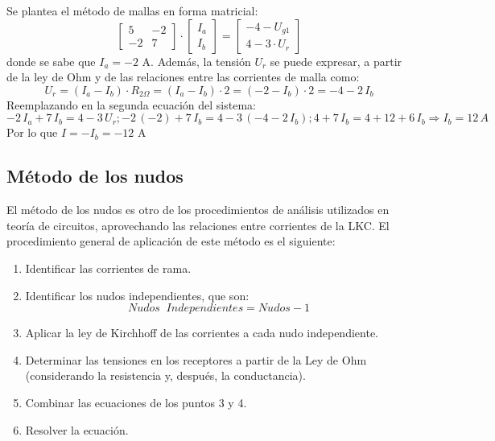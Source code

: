 \begin{example}
  Se plantea el método de mallas en forma matricial:
  \begin{equation*}
    \begin{bmatrix}
      5 & -2 \\
      -2 & 7 
    \end{bmatrix} \cdot 
    \begin{bmatrix}
      I_a\\
      I_b
    \end{bmatrix} = %
    \begin{bmatrix}
      -4-U_{g1} \\
      4-3\cdot U_r
    \end{bmatrix}
  \end{equation*}
  donde se sabe que $I_a=-2$ A. Además, la tensión $U_r$ se puede
  expresar, a partir de la ley de Ohm y de las relaciones entre las
  corrientes de malla como:
  \begin{equation*}
    U_r=(I_a-I_b)\cdot R_{2\Omega}=(I_a-I_b)\cdot 2 = (-2-I_b)\cdot 2=-4-2\, I_b
  \end{equation*}
  Reemplazando en la segunda ecuación del sistema:
  \begin{equation*}
    -2\, I_a+7\,I_b=4-3\,U_r; -2\,(-2)+7\, I_b=4-3\,(-4-2\,I_b); 4+7\,I_b=4+12+6\,I_b\Rightarrow I_b=12\, A 
  \end{equation*}
  Por lo que $I=-I_b=-12$ A
\end{example}
	

\subsection{Método de los nudos}
\label{sec:nudos}
El método de los nudos es otro de los procedimientos de análisis
utilizados en teoría de circuitos, aprovechando las relaciones entre
corrientes de la LKC. El procedimiento general de aplicación de este
método es el siguiente:
\begin{enumerate}
\item Identificar las corrientes de rama.
\item Identificar los nudos independientes, que son:
  \begin{equation*} {Nudos\;\;Independientes=Nudos-1}
  \end{equation*}
\item Aplicar la ley de Kirchhoff de las corrientes a cada nudo
  independiente.
\item Determinar las tensiones en los receptores a partir de la Ley de
  Ohm (considerando la resistencia y, después, la conductancia).
\item Combinar las ecuaciones de los puntos 3 y 4.
\item Resolver la ecuación.
\end{enumerate}
	
